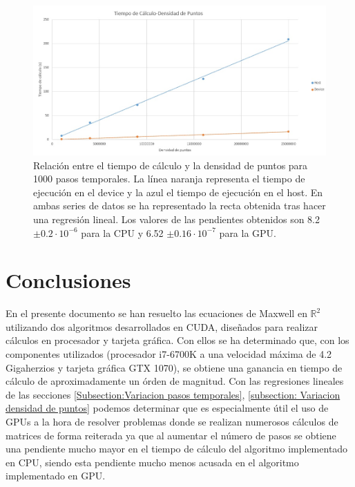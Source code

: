 \documentclass[11pt,a4paper,twoside,pdf]{article}
\numberwithin{equation}{section}
\begin{document}
\begin{figure}[h]
\centering
\includegraphics[width=15 cm]{T-Densidad_de_Puntos.jpg}				
\caption{Relación entre el tiempo de cálculo y la densidad de puntos para 1000 pasos temporales. La línea naranja representa el tiempo de ejecución en el device y la azul el tiempo de ejecución en el host. En ambas series de datos se ha representado la recta obtenida tras hacer una regresión lineal. Los valores de las pendientes obtenidos son 8.2 $\pm 0.2 \cdot 10^{-6}$ para la CPU y 6.52 $\pm 0.16 \cdot 10^{-7}$ para la GPU.}
\label{fig:t-densidad_de_puntos}
\end{figure}
\noindent









\section{Conclusiones}


En el presente documento se han resuelto las ecuaciones de Maxwell en $\mathbb R^{2}$ utilizando dos algoritmos desarrollados en CUDA, diseñados para realizar cálculos en procesador y tarjeta gráfica. Con ellos se ha determinado que, con los componentes utilizados (procesador i7-6700K  a una velocidad máxima de 4.2 Gigaherzios y tarjeta gráfica GTX 1070), se obtiene una ganancia en tiempo de cálculo de aproximadamente un órden de magnitud. Con las regresiones lineales de las secciones \ref{Subsection:Variacion pasos temporales}, \ref{subsection: Variacion densidad de puntos} podemos determinar que es especialmente útil el uso de GPUs a la hora de resolver problemas donde se realizan numerosos cálculos de matrices de forma reiterada ya que al aumentar el número de pasos se obtiene una pendiente mucho mayor en el tiempo de cálculo del algoritmo implementado en CPU, siendo esta pendiente mucho menos acusada en el algoritmo implementado en GPU.
\end{document}
